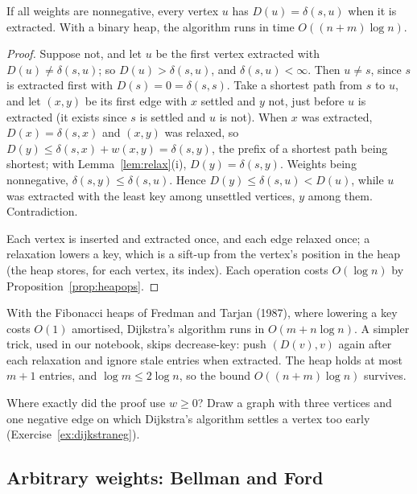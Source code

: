 \begin{theorem}[Dijkstra, 1959]\label{thm:dijkstra}
If all weights are nonnegative, every vertex $u$ has $D(u)=\delta(s,u)$ when it is extracted. With a binary heap, the algorithm runs in time $O((n+m)\log n)$.
\end{theorem}
\begin{proof}
Suppose not, and let $u$ be the first vertex extracted with $D(u)\ne\delta(s,u)$; so $D(u)>\delta(s,u)$, and $\delta(s,u)<\infty$. Then $u\ne s$, since $s$ is extracted first with $D(s)=0=\delta(s,s)$. Take a shortest path from $s$ to $u$, and let
$(x,y)$ be its first edge with $x$ settled and $y$ not, just before $u$ is extracted (it exists since $s$ is settled and $u$ is not). When $x$ was extracted, $D(x)=\delta(s,x)$ and $(x,y)$ was relaxed, so $D(y)\le\delta(s,x)+w(x,y)=\delta(s,y)$, the prefix of a shortest path being shortest; with Lemma~\ref{lem:relax}(i), $D(y)=\delta(s,y)$.
Weights being nonnegative, $\delta(s,y)\le\delta(s,u)$. Hence $D(y)\le\delta(s,u)<D(u)$, while $u$ was extracted with the least key among unsettled vertices, $y$ among them. Contradiction.

Each vertex is inserted and extracted once, and each edge relaxed once; a relaxation lowers a key, which is a sift-up from the vertex's position in the heap (the heap stores, for each vertex, its index). Each
operation costs $O(\log n)$ by Proposition~\ref{prop:heapops}.
\end{proof}

\begin{remark}
With the Fibonacci heaps of Fredman and Tarjan (1987), where lowering a key costs $O(1)$ amortised, Dijkstra's algorithm runs in $O(m+n\log n)$. A simpler trick, used in our notebook, skips decrease-key: push
$(D(v),v)$ again after each relaxation and ignore stale entries when extracted. The heap holds at most $m+1$ entries, and $\log m\le2\log n$, so the bound $O((n+m)\log n)$ survives.
\end{remark}

\begin{think}
Where exactly did the proof use $w\ge0$? Draw a graph with three vertices and one negative edge on which Dijkstra's algorithm settles a vertex too early (Exercise~\ref{ex:dijkstraneg}).
\end{think}

\subsection*{Arbitrary weights: Bellman and Ford}

